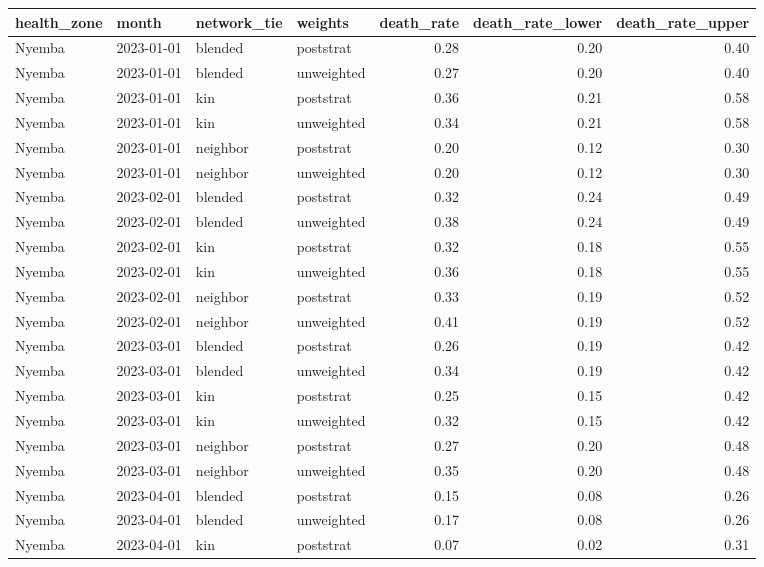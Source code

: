 \begin{table}[ht]
\centering
\begin{tabular}{llllrrr}
  \toprule
health\_zone & month & network\_tie & weights & death\_rate & death\_rate\_lower & death\_rate\_upper \\ 
  \midrule
Nyemba & 2023-01-01 & blended & poststrat & 0.28 & 0.20 & 0.40 \\ 
  Nyemba & 2023-01-01 & blended & unweighted & 0.27 & 0.20 & 0.40 \\ 
  Nyemba & 2023-01-01 & kin & poststrat & 0.36 & 0.21 & 0.58 \\ 
  Nyemba & 2023-01-01 & kin & unweighted & 0.34 & 0.21 & 0.58 \\ 
  Nyemba & 2023-01-01 & neighbor & poststrat & 0.20 & 0.12 & 0.30 \\ 
  Nyemba & 2023-01-01 & neighbor & unweighted & 0.20 & 0.12 & 0.30 \\ 
  Nyemba & 2023-02-01 & blended & poststrat & 0.32 & 0.24 & 0.49 \\ 
  Nyemba & 2023-02-01 & blended & unweighted & 0.38 & 0.24 & 0.49 \\ 
  Nyemba & 2023-02-01 & kin & poststrat & 0.32 & 0.18 & 0.55 \\ 
  Nyemba & 2023-02-01 & kin & unweighted & 0.36 & 0.18 & 0.55 \\ 
  Nyemba & 2023-02-01 & neighbor & poststrat & 0.33 & 0.19 & 0.52 \\ 
  Nyemba & 2023-02-01 & neighbor & unweighted & 0.41 & 0.19 & 0.52 \\ 
  Nyemba & 2023-03-01 & blended & poststrat & 0.26 & 0.19 & 0.42 \\ 
  Nyemba & 2023-03-01 & blended & unweighted & 0.34 & 0.19 & 0.42 \\ 
  Nyemba & 2023-03-01 & kin & poststrat & 0.25 & 0.15 & 0.42 \\ 
  Nyemba & 2023-03-01 & kin & unweighted & 0.32 & 0.15 & 0.42 \\ 
  Nyemba & 2023-03-01 & neighbor & poststrat & 0.27 & 0.20 & 0.48 \\ 
  Nyemba & 2023-03-01 & neighbor & unweighted & 0.35 & 0.20 & 0.48 \\ 
  Nyemba & 2023-04-01 & blended & poststrat & 0.15 & 0.08 & 0.26 \\ 
  Nyemba & 2023-04-01 & blended & unweighted & 0.17 & 0.08 & 0.26 \\ 
  Nyemba & 2023-04-01 & kin & poststrat & 0.07 & 0.02 & 0.31 \\ 

\end{tabular}
\end{table}
